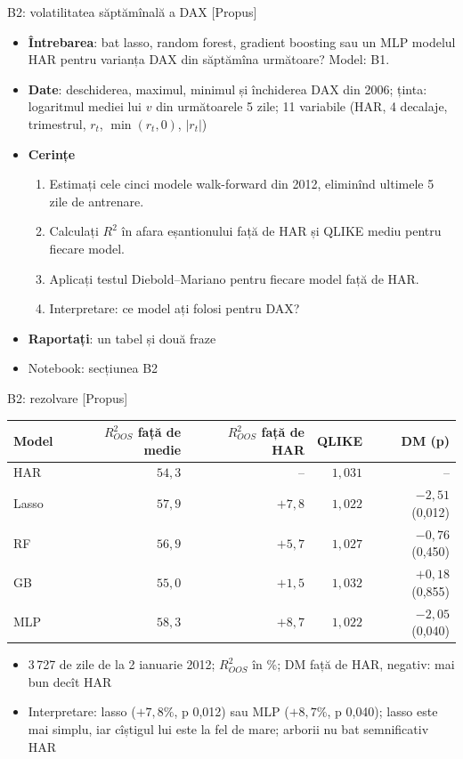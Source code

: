 \begin{frame}{B2: volatilitatea săptămînală a DAX [Propus]}
\itemsize{\footnotesize}
\begin{itemize}
\item \textbf{Întrebarea}: bat lasso, random forest, gradient boosting sau un MLP modelul HAR pentru varianța DAX din săptămîna următoare? Model: B1.
\item \textbf{Date}: deschiderea, maximul, minimul și închiderea DAX din 2006; ținta: logaritmul mediei lui $v$ din următoarele 5 zile; 11 variabile (HAR, 4 decalaje, trimestrul, $r_t$, $\min(r_t, 0)$, $|r_t|$)
\item \textbf{Cerințe}
\begin{enumerate}
    \item Estimați cele cinci modele walk-forward din 2012, eliminînd ultimele 5 zile de antrenare.
    \item Calculați $R^2$ în afara eșantionului față de HAR și QLIKE mediu pentru fiecare model.
    \item Aplicați testul Diebold--Mariano pentru fiecare model față de HAR.
    \item Interpretare: ce model ați folosi pentru DAX?
\end{enumerate}
\item \textbf{Raportați}: un tabel și două fraze
\item Notebook: secțiunea B2
\end{itemize}
\end{frame}

\ifsolutions
\begin{frame}{B2: rezolvare [Propus]}
\itemsize{\footnotesize}
\begin{center}
\footnotesize
\begin{tabular}{lrrrr}
\toprule
Model & $R^2_{OOS}$ față de medie & $R^2_{OOS}$ față de HAR & QLIKE & DM (p) \\
\midrule
HAR & $54{,}3$ & -- & $1{,}031$ & -- \\
Lasso & $57{,}9$ & ${+7{,}8}$ & $1{,}022$ & ${-2{,}51}$ (0{,}012) \\
RF & $56{,}9$ & ${+5{,}7}$ & $1{,}027$ & ${-0{,}76}$ (0{,}450) \\
GB & $55{,}0$ & ${+1{,}5}$ & $1{,}032$ & ${+0{,}18}$ (0{,}855) \\
MLP & $58{,}3$ & ${+8{,}7}$ & $1{,}022$ & ${-2{,}05}$ (0{,}040) \\
\bottomrule
\end{tabular}
\end{center}
\begin{itemize}
    \item 3\,727 de zile de la 2 ianuarie 2012; $R^2_{OOS}$ în \%; DM față de HAR, negativ: mai bun decît HAR
    \item Interpretare: lasso ($+7{,}8\%$, p 0{,}012) sau MLP ($+8{,}7\%$, p 0{,}040); lasso este mai simplu, iar cîștigul lui este la fel de mare; arborii nu bat semnificativ HAR
\end{itemize}
\end{frame}
\fi

